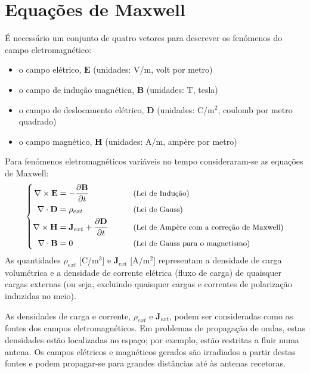\section{Equações de Maxwell}
\label{sec:maxwell-eq}

É necessário um conjunto de quatro vetores para descrever os fenómenos do campo eletromagnético:
\begin{itemize}
    \item[] o campo elétrico, $\mathbf{E}$ (unidades: V/m, volt por metro)
    \item[] o campo de indução magnética, $\mathbf{B}$ (unidades: T, tesla)
    \item[] o campo de deslocamento elétrico, $\mathbf{D}$ (unidades: C/m$^2$, coulomb por metro quadrado)
    \item[] o campo magnético, $\mathbf{H}$ (unidades: A/m, ampère por metro)
\end{itemize}

Para fenómenos eletromagnéticos variáveis no tempo consideraram-se as equações de Maxwell:
$$
    \left\{
    \begin{aligned}%
        \nabla \times \mathbf{E} &= -\dfrac{\partial \mathbf{B}}{\partial t} 
        & &\qquad\text{\small (Lei de Indução)} \\
        \nabla \cdot \mathbf{D} &= \rho_{ext} 
        & &\qquad\text{\small (Lei de Gauss)} \\
        \nabla \times \mathbf{H} &= \mathbf{J}_{ext} + \dfrac{\partial \mathbf{D}}{\partial t} 
        & &\qquad\text{\small (Lei de Ampère com a correção de Maxwell)} \\
        \nabla \cdot \mathbf{B} &= 0 
        & &\qquad\text{\small (Lei de Gauss para o magnetismo)}
    \end{aligned}
    \right.
$$
As quantidades $\rho_{ext}$ $[$C/m$^3]$ e $\mathbf{J}_{ext}$ $[$A/m$^2]$ representam a densidade de carga volumétrica e a densidade de corrente elétrica (fluxo de carga) de quaisquer cargas externas (ou seja, excluindo quaisquer cargas e correntes de polarização induzidas no meio).

As densidades de carga e corrente, $\rho_{ext}$ e $\mathbf{J}_{ext}$, podem ser consideradas como as fontes dos campos eletromagnéticos. Em problemas de propagação de ondas, estas densidades estão localizadas no espaço; por exemplo, estão restritas a fluir numa antena. Os campos elétricos e magnéticos gerados são irradiados a partir destas fontes e podem propagar-se para grandes distâncias até às antenas recetoras.

